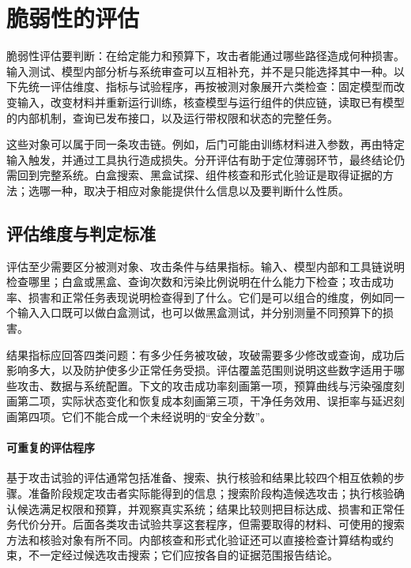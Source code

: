 \section{脆弱性的评估}
\label{sec:security-evaluation}

脆弱性评估要判断：在给定能力和预算下，攻击者能通过哪些路径造成何种损害。输入测试、模型内部分析与系统审查可以互相补充，并不是只能选择其中一种。以下先统一评估维度、指标与试验程序，再按被测对象展开六类检查：固定模型而改变输入，改变材料并重新运行训练，核查模型与运行组件的供应链，读取已有模型的内部机制，查询已发布接口，以及运行带权限和状态的完整任务。

这些对象可以属于同一条攻击链。例如，后门可能由训练材料进入参数，再由特定输入触发，并通过工具执行造成损失。分开评估有助于定位薄弱环节，最终结论仍需回到完整系统。白盒搜索、黑盒试探、组件核查和形式化验证是取得证据的方法；选哪一种，取决于相应对象能提供什么信息以及要判断什么性质。

\subsection{评估维度与判定标准}
\label{sec:security-risk-assessment}

评估至少需要区分被测对象、攻击条件与结果指标。输入、模型内部和工具链说明检查哪里；白盒或黑盒、查询次数和污染比例说明在什么能力下检查；攻击成功率、损害和正常任务表现说明检查得到了什么。它们是可以组合的维度，例如同一个输入入口既可以做白盒测试，也可以做黑盒测试，并分别测量不同预算下的损害。

结果指标应回答四类问题：有多少任务被攻破，攻破需要多少修改或查询，成功后影响多大，以及防护使多少正常任务受损。评估覆盖范围则说明这些数字适用于哪些攻击、数据与系统配置。下文的攻击成功率刻画第一项，预算曲线与污染强度刻画第二项，实际状态变化和恢复成本刻画第三项，干净任务效用、误拒率与延迟刻画第四项。它们不能合成一个未经说明的“安全分数”。

\paragraph{可重复的评估程序}

基于攻击试验的评估通常包括准备、搜索、执行核验和结果比较四个相互依赖的步骤。准备阶段规定攻击者实际能得到的信息；搜索阶段构造候选攻击；执行核验确认候选满足权限和预算，并观察真实系统；结果比较则把目标达成、损害和正常任务代价分开。后面各类攻击试验共享这套程序，但需要取得的材料、可使用的搜索方法和核验对象有所不同。内部核查和形式化验证还可以直接检查计算结构或约束，不一定经过候选攻击搜索；它们应按各自的证据范围报告结论。

